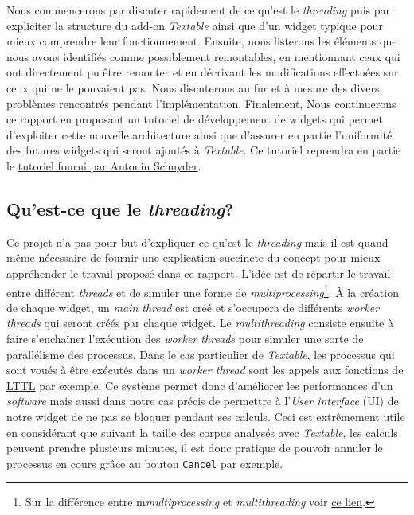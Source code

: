 \documentclass{article}
\begin{document}
Nous commencerons par discuter rapidement de ce qu'est le \textit{threading} puis par expliciter la structure du add-on \textit{Textable} ainsi que d'un widget typique pour mieux comprendre leur fonctionnement. Ensuite, nous listerons les éléments que nous avons identifiés comme possiblement remontables, en mentionnant ceux qui ont directement pu être remonter et en décrivant les modifications effectuées sur ceux qui ne le pouvaient pas. Nous discuterons au fur et à mesure des divers problèmes rencontrés pendant l'implémentation. Finalement, Nous continuerons ce rapport en proposant un tutoriel de développement de widgets qui permet d'exploiter cette nouvelle architecture ainsi que d'assurer en partie l'uniformité des futures widgets qui seront ajoutés à \textit{Textable}. Ce tutoriel reprendra en partie le \href{https://docs.google.com/document/d/1QtXm2aYMZXAyM7mfBTqxt_XrTNFqC7e3aqy7OC1A_18/edit}{tutoriel fourni par Antonin Schnyder}.

\subsection{Qu'est-ce que le \textit{threading}?}

Ce projet n'a pas pour but d'expliquer ce qu'est le \textit{threading} mais il est quand même nécessaire de fournir une explication succincte du concept pour mieux appréhender le travail proposé dans ce rapport.
L'idée est de répartir le travail entre différent \textit{threads} et de simuler une forme de \textit{multiprocessing}\footnote{Sur la différence entre m\textit{multiprocessing} et \textit{multithreading} voir \href{https://www.geeksforgeeks.org/difference-between-multithreading-vs-multiprocessing-in-python/}{ce lien}.}. À la création de chaque widget, un \textit{main thread} est créé et s'occupera de différents \textit{worker threads} qui seront créés par chaque widget. Le \textit{multithreading} consiste ensuite à faire s'enchaîner l'exécution des \textit{worker threads} pour simuler une sorte de parallélisme des processus. Dans le cas particulier de \textit{Textable}, les processus qui sont voués à être exécutés dans un \textit{worker thread} sont les appels aux fonctions de \href{https://github.com/axanthos/LTTL}{LTTL} par exemple.
Ce système permet donc d'améliorer les performances d'un \textit{software} mais aussi dans notre cas précis de permettre à l'\textit{User interface} (UI) de notre widget de ne pas se bloquer pendant ses calculs. Ceci est extrêmement utile en considérant que suivant la taille des corpus analysés avec \textit{Textable}, les calculs peuvent prendre plusieurs minutes, il est donc pratique de pouvoir annuler le processus en cours grâce au bouton \texttt{Cancel} par exemple.
\end{document}
